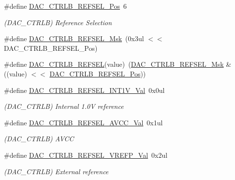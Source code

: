 \begin{DoxyCompactItemize}
\item 
\#define \mbox{\hyperlink{group___s_a_m_d21___d_a_c_gace1da3ee1cda6efe12a220080a718b99}{D\+A\+C\+\_\+\+C\+T\+R\+L\+B\+\_\+\+R\+E\+F\+S\+E\+L\+\_\+\+Pos}}~6
\begin{DoxyCompactList}\small\item\em (D\+A\+C\+\_\+\+C\+T\+R\+LB) Reference Selection \end{DoxyCompactList}\item 
\#define \mbox{\hyperlink{group___s_a_m_d21___d_a_c_ga257979650aa6e806ad98f4095f58dd52}{D\+A\+C\+\_\+\+C\+T\+R\+L\+B\+\_\+\+R\+E\+F\+S\+E\+L\+\_\+\+Msk}}~(0x3ul $<$$<$ D\+A\+C\+\_\+\+C\+T\+R\+L\+B\+\_\+\+R\+E\+F\+S\+E\+L\+\_\+\+Pos)
\item 
\#define \mbox{\hyperlink{group___s_a_m_d21___d_a_c_gab75aa87cd7f0a1813d5e73f2dba5057e}{D\+A\+C\+\_\+\+C\+T\+R\+L\+B\+\_\+\+R\+E\+F\+S\+EL}}(value)~(\mbox{\hyperlink{group___s_a_m_d21___d_a_c_ga257979650aa6e806ad98f4095f58dd52}{D\+A\+C\+\_\+\+C\+T\+R\+L\+B\+\_\+\+R\+E\+F\+S\+E\+L\+\_\+\+Msk}} \& ((value) $<$$<$ \mbox{\hyperlink{group___s_a_m_d21___d_a_c_gace1da3ee1cda6efe12a220080a718b99}{D\+A\+C\+\_\+\+C\+T\+R\+L\+B\+\_\+\+R\+E\+F\+S\+E\+L\+\_\+\+Pos}}))
\item 
\#define \mbox{\hyperlink{group___s_a_m_d21___d_a_c_gafc2e72a0d035fcbf05dad162c768467c}{D\+A\+C\+\_\+\+C\+T\+R\+L\+B\+\_\+\+R\+E\+F\+S\+E\+L\+\_\+\+I\+N\+T1\+V\+\_\+\+Val}}~0x0ul
\begin{DoxyCompactList}\small\item\em (D\+A\+C\+\_\+\+C\+T\+R\+LB) Internal 1.\+0V reference \end{DoxyCompactList}\item 
\#define \mbox{\hyperlink{group___s_a_m_d21___d_a_c_ga0ec9e0f724ebc16f883f720380d25771}{D\+A\+C\+\_\+\+C\+T\+R\+L\+B\+\_\+\+R\+E\+F\+S\+E\+L\+\_\+\+A\+V\+C\+C\+\_\+\+Val}}~0x1ul
\begin{DoxyCompactList}\small\item\em (D\+A\+C\+\_\+\+C\+T\+R\+LB) A\+V\+CC \end{DoxyCompactList}\item 
\#define \mbox{\hyperlink{group___s_a_m_d21___d_a_c_ga63711351571cbeb5c161639aee8d6252}{D\+A\+C\+\_\+\+C\+T\+R\+L\+B\+\_\+\+R\+E\+F\+S\+E\+L\+\_\+\+V\+R\+E\+F\+P\+\_\+\+Val}}~0x2ul
\begin{DoxyCompactList}\small\item\em (D\+A\+C\+\_\+\+C\+T\+R\+LB) External reference \end{DoxyCompactList}\item 

\end{DoxyCompactItemize}
